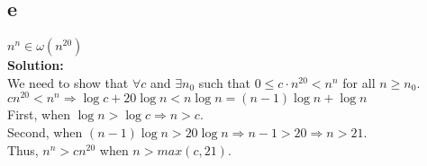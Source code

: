 \documentclass[12pt]{article}
\begin{document}
\begin{minipage}[t]{24cm}
\begin{itemize}
\part{e} $n^{n} \in \omega(n^{20})$
\\\textbf{Solution: }
\\We need to show that $\forall c$ and $\exists {n_0}$ such that $0 \leq c \cdot n^{20} < n^n$ for all $n \geq {n_0}$.
\\$cn^{20} < n^n \Rightarrow \log c + 20 \log n < n \log n = (n-1) \log n + \log n$
\\First, when $\log n > \log c \Rightarrow n > c$.
\\Second, when $(n-1) \log n > 20 \log n \Rightarrow n-1 > 20 \Rightarrow n > 21$.
\\Thus, $n^n > cn^{20}$ when $n > max(c,21)$.
\end{itemize}
\end{minipage}
\end{document}
